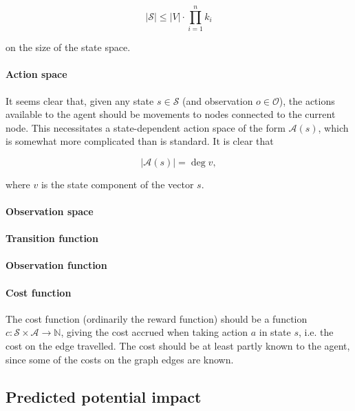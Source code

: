 \[
    \lvert \mathcal S \rvert \leq \lvert V \rvert \cdot \prod_{i = 1}^n k_i
\]

on the size of the state space.

\paragraph{Action space} It seems clear that, given any state $s \in \mathcal S$ (and observation $o \in \mathcal O$), the actions available to the agent should be movements to nodes connected to the current node. This necessitates a state-dependent action space of the form $\mathcal A(s)$, which is somewhat more complicated than is standard. It is clear that

\[
    \lvert \mathcal A(s) \rvert = \deg v,
\]

where $v$ is the state component of the vector $s$.

\paragraph{Observation space} 

\paragraph{Transition function} 

\paragraph{Observation function} 

\paragraph{Cost function} The cost function (ordinarily the reward function) should be a function $c \colon \mathcal S \times \mathcal A \to \mathbb N$, giving the cost accrued when taking action $a$ in state $s$, i.e. the cost on the edge travelled. The cost should be at least partly known to the agent, since some of the costs on the graph edges are known.

\subsection{Predicted potential impact}








